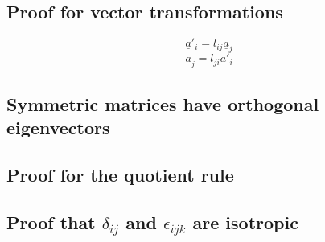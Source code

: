\documentclass[11pt, letterpaper]{article}
\newcommand{\e}{\epsilon}
\newcommand{\dl}{\delta}
\newcommand{\1}{\bm{1}}
\newcommand{\un}[1]{\underline{#1}}
\begin{document}
\subsection{Proof for vector transformations}
$$\un{a}'_i= l_{ij}\un{a}_j$$
$$\un{a}_j = l_{ji}\un{a}'_i$$

\subsection{Symmetric matrices have orthogonal eigenvectors}

\subsection{Proof for the quotient rule}

\subsection{Proof that $\dl_{ij}$ and $\e_{ijk}$ are isotropic}
\end{document}
